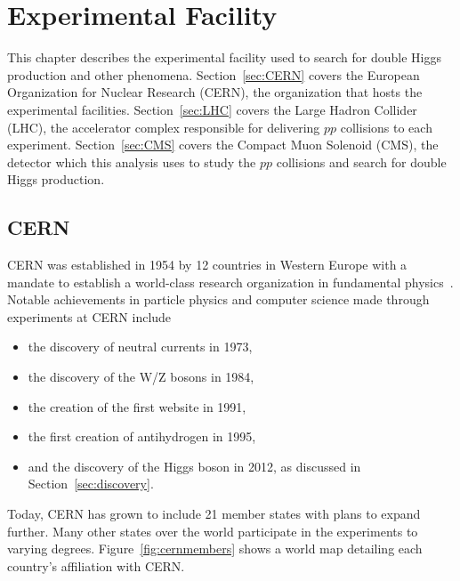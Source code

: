 
\chapter{Experimental Facility\label{ch:experiment}}

This chapter describes the experimental facility used to search for double Higgs production and other phenomena. Section~\ref{sec:CERN} covers the European Organization for Nuclear Research (CERN), the organization
that hosts the experimental facilities. Section~\ref{sec:LHC} covers the Large Hadron Collider (LHC), the accelerator complex responsible for delivering $pp$ collisions to each experiment.
Section~\ref{sec:CMS}
covers the Compact Muon Solenoid (CMS), the detector which this analysis uses to study the $pp$ collisions and search for double Higgs production.


\section{CERN\label{sec:CERN}}

CERN was established in 1954 by 12 countries in Western Europe with a mandate to establish a
world-class research organization in fundamental physics~\cite{cern:public}. Notable
achievements in particle physics and computer science made through experiments at CERN include

\begin{itemize}
\item the discovery of neutral currents in 1973,
\item the discovery of the W/Z bosons in 1984,
\item the creation of the first website in 1991,
\item the first creation of antihydrogen in 1995,
\item and the discovery of the Higgs boson in 2012, as discussed in Section~\ref{sec:discovery}.
\end{itemize}

Today, CERN has grown to include 21 member states with plans to expand further. Many other states
over the world participate in the experiments to varying degrees. Figure~\ref{fig:cernmembers}
shows a world map detailing each country's affiliation with CERN.

